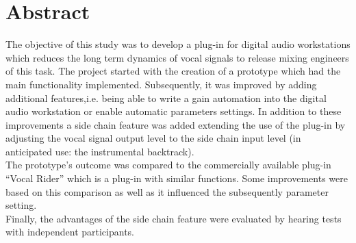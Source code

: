 \chapter*{Abstract}

The objective of this study was to develop a plug-in for digital audio workstations which reduces the long term dynamics of vocal signals to release mixing engineers of this task. The project started with the creation of a prototype which had the main functionality implemented. Subsequently, it was improved by adding additional features,i.e. being able to write a gain automation into the digital audio workstation or enable automatic parameters settings. In addition to these improvements a side chain feature was added extending the use of the plug-in by adjusting the vocal signal output level to the side chain input level (in anticipated use: the instrumental backtrack).\\
The prototype's outcome was compared to the commercially available plug-in “Vocal Rider”\cite{VR} which is a plug-in with similar functions. Some improvements were based on this comparison as well as it influenced the subsequently parameter setting.\\
Finally, the advantages of the side chain feature were evaluated by hearing tests with independent participants.\\